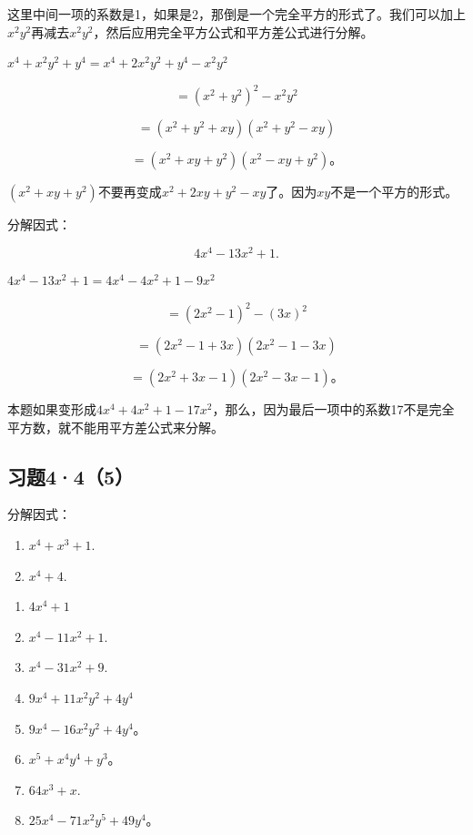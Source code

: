 这里中间一项的系数是1，如果是2，那倒是一个完全平方的形式了。我们可以加上\(x^{2}y^{2}\)再减去\(x^{2}y^{2}\)，然后应用完全平方公式和平方差公式进行分解。

\(x^{4} + x^{2}y^{2} + y^{4} = x^{4} + 2x^{2}y^{2} + y^{4} - x^{2}y^{2}\)

\[
= (x ^{2} + y ^{2}) ^{2} - x ^{2} y ^{2}
\]

\[
= (x ^{2} + y ^{2} + x y) (x ^{2} + y ^{2} - x y)
\]

\[
= (x ^{2} + x y + y ^{2}) (x ^{2} - x y + y ^{2})\text{。}
\]

\((x^{2} + xy + y^{2})\)不要再变成\(x^{2} + 2xy + y^{2} - xy\)了。因为\(xy\)不是一个平方的形式。

 分解因式：

\[
4 x ^{4} - 13 x ^{2} + 1.
\]

\(4x^{4} - 13x^{2} + 1 = 4x^{4} - 4x^{2} + 1 - 9x^{2}\)

\[
= (2 x ^{2} - 1) ^{2} - (3 x) ^{2}
\]

\[
= (2 x ^{2} - 1 + 3 x) (2 x ^{2} - 1 - 3 x)
\]

\[
= (2 x ^{2} + 3 x - 1) (2 x ^{2} - 3 x - 1)\text{。}
\]

本题如果变形成\(4x^{4} + 4x^{2} + 1 - 17x^{2}\)，那么，因为最后一项中的系数17不是完全平方数，就不能用平方差公式来分解。

\subsection{习题4·4（5）}

分解因式：

\begin{enumerate}[start=1]
\item
  \(x^{4} + x^{3} + 1.\)
\item
  \(x^{4} + 4.\)
\end{enumerate}

\begin{enumerate}[start=3]
\item
  \(4x^{4} + 1\)
\item
  \(x^{4} - 11x^{2} + 1.\)
\item
  \(x^{4} - 31x^{2} + 9.\)
\item
  \(9x^{4} + 11x^{2}y^{2} + 4y^{4}\)
\item
  \(9x^{4} - 16x^{2}y^{2} + 4y^{4}\)。
\item
  \(x^{5} + x^{4}y^{4} + y^{3}\)。
\item
  \(64x^{3} + x.\)
\item
  \(25x^{4} - 71x^{2}y^{5} + 49y^{4}\)。
\end{enumerate}

